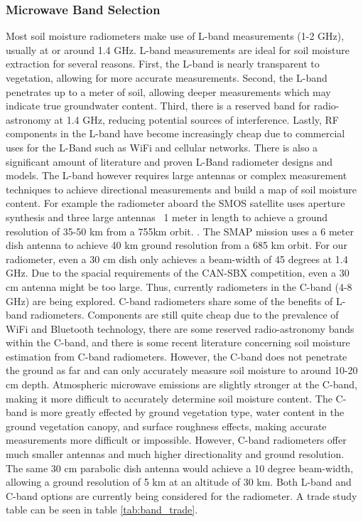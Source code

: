 \documentclass[12pt]{article}
\begin{document}
\subsubsection{Microwave Band Selection}

Most soil moisture radiometers make use of L-band measurements (1-2 GHz), usually at or around 1.4 GHz. L-band measurements are ideal for soil moisture extraction for several reasons. First, the L-band is nearly transparent to vegetation, allowing for more accurate measurements. Second, the L-band penetrates up to a meter of soil, allowing deeper measurements which may indicate true groundwater content. Third, there is a reserved band for radio-astronomy at 1.4 GHz, reducing potential sources of interference. Lastly, RF components in the L-band have become increasingly cheap due to commercial uses for the L-Band such as WiFi and cellular networks. There is also a significant amount of literature and proven L-Band radiometer designs and models. The L-band however requires large antennas or complex measurement techniques to achieve directional measurements and build a map of soil moisture content. For example the radiometer aboard the SMOS satellite uses aperture synthesis and three large antennas ~1 meter in length to achieve a ground resolution of 35-50 km from a 755km orbit. \cite{Wigneron2010}. The SMAP mission uses a 6 meter dish antenna to achieve 40 km ground resolution from a 685 km orbit. \cite{entekhabi_njoku_oneill_spencer_jackson_entin_im_kellogg_2008}  For our radiometer, even a 30 cm dish only achieves a beam-width of 45 degrees at 1.4 GHz. Due to the spacial requirements of the CAN-SBX competition, even a 30 cm antenna might be too large. Thus, currently radiometers in the C-band (4-8 GHz) are being explored. C-band radiometers share some of the benefits of L-band radiometers. Components are still quite cheap due to the prevalence of WiFi and Bluetooth technology, there are some reserved radio-astronomy bands within the C-band, and there is some recent literature concerning soil moisture estimation from C-band radiometers. \cite{Description2000,jackson_gasiewski_oldak_klein_njoku_yevgrafov_christiani_bindlish_2002} However, the C-band does not penetrate the ground as far and can only accurately measure soil moisture to around 10-20 cm depth. Atmospheric microwave emissions are slightly stronger at the C-band, making it more difficult to accurately determine soil moisture content. The C-band is more greatly effected by ground vegetation type, water content in the ground vegetation canopy, and surface roughness effects, making accurate measurements more difficult or impossible. \cite{ulaby_fung_moore_1986} However, C-band radiometers offer much smaller antennas and much higher directionality and ground resolution. The same 30 cm parabolic dish antenna would achieve a 10 degree beam-width, allowing a ground resolution of 5 km at an altitude of 30 km. Both L-band and C-band options are currently being considered for the radiometer. A trade study table can be seen in table \ref{tab:band_trade}.
\end{document}
